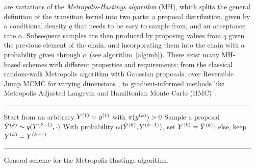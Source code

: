  are variations of the \emph{Metropolis-Hastings algorithm}
(MH), which splits the general definition of the transition kernel into two parts: a proposal
distribution, given by a conditional density \(q\) that needs to be easy to sample from, and an
acceptance rate \(\alpha\).  Subsequent samples are then produced by proposing values from \(q\)
given the previous element of the chain, and incorporating them into the chain with a probability
given through \(\alpha\) (see algorithm~\ref{alg:mh}).  There exist many MH-based schemes with
different properties and requirements: from the classical random-walk Metropolis algorithm with
Gaussian proposals, over Reversible Jump MCMC for varying dimensions
\parencite{green1995reversible}, to gradient-informed methods like Metropolis Adjusted Langevin and
Hamiltonian Monte Carlo (HMC) \parencite{betancourt2018conceptual,girolami2011riemann}.


\begin{algorithm}[t]
  \hrule
  \begin{algorithmic}
    \State Start from an arbitrary \(\kth[1]{Y} = \kth[1]{y}\) with \(\pi(\kth{y}) > 0\)
    \State Sample a proposal \(\kth[k]{\hat{Y}} \from q(\kth[k-1]{Y}, \cdot)\)
    \State With probability \(\alpha(\kth[k]{\hat{Y}}, \kth[k-1]{Y})\), set
    \(\kth[k]{Y} = \kth[k]{\hat{Y}}\); else, keep \(\kth[k]{Y} = \kth[k-1]{Y}\)
    \EndFor
  \end{algorithmic}
  \hrule
  \caption{General scheme for the Metropolis-Hastings algorithm.\label{alg:mh}}
\end{algorithm}

